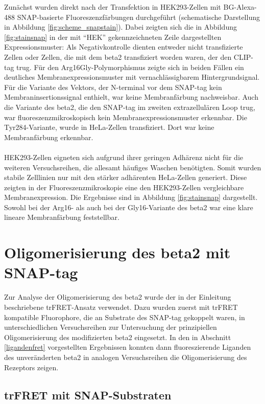 Zunächst wurden direkt nach der Transfektion in HEK293-Zellen mit BG-Alexa-488 SNAP-basierte Fluoreszenzfärbungen durchgeführt (schematische Darstellung in Abbildung \ref{fig:scheme_snapstain}). Dabei zeigten sich die in Abbildung \ref{fig:stainsnap} in der mit "`HEK"' gekennzeichneten Zeile dargestellten Expressionsmuster: Als Negativkontrolle dienten entweder nicht transfizierte Zellen oder Zellen, die mit dem \gls{beta2} transfiziert worden waren, der den CLIP-tag trug. Für den Arg16Gly-Polymorphismus zeigte sich in beiden Fällen ein deutliches Membranexpressionsmuster mit vernachlässigbarem Hintergrundsignal. Für die Variante des Vektors, der N-terminal vor dem SNAP-tag kein Membraninsertionssignal enthielt, war keine Membranfärbung nachweisbar. Auch die Variante des \gls{beta2}, die den SNAP-tag im zweiten extrazellulären Loop trug, war fluoreszenzmikroskopisch kein Membranexpressionsmuster erkennbar. Die Tyr284-Variante, wurde in HeLa-Zellen transfiziert. Dort war keine Membranfärbung erkennbar.
\\ \\
HEK293-Zellen eigneten sich aufgrund ihrer geringen Adhärenz nicht für die weiteren Versuchsreihen, die allesamt häufiges Waschen benötigten. Somit wurden stabile Zelllinien nur mit den stärker adhärenten HeLa-Zellen generiert. Diese zeigten in der Fluoreszenzmikroskopie eine den HEK293-Zellen vergleichbare Membranexpression. Die Ergebnisse sind in Abbildung \ref{fig:stainsnap} dargestellt. Sowohl bei der Arg16- als auch bei der Gly16-Variante des \gls{beta2} war eine klare lineare Membranfärbung feststellbar.

\section{Oligomerisierung des \gls{beta2} mit SNAP-tag}
Zur Analyse der Oligomerisierung des \gls{beta2} wurde der in der Einleitung beschriebene trFRET-Ansatz verwendet. Dazu wurden zuerst mit trFRET kompatible Fluorophore, die an Substrate des SNAP-tag gekoppelt waren, in unterschiedlichen Versuchsreihen zur Untersuchung der prinzipiellen Oligomerisierung des modifizierten \gls{beta2} eingesetzt. In den in Abschnitt \ref{ligandenfret} vorgestellten Ergebnissen konnten dann fluoreszierende Liganden des unveränderten \gls{beta2} in analogen Versuchsreihen die Oligomerisierung des Rezeptors zeigen.

\subsection{trFRET mit SNAP-Substraten}

